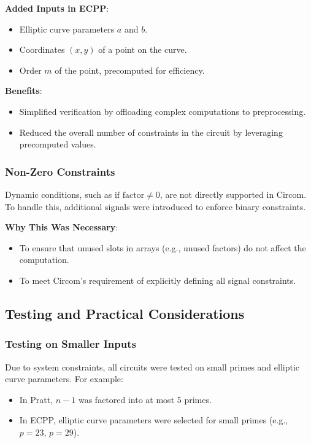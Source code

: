 \documentclass[12pt]{article}
\begin{document}
\textbf{Added Inputs in ECPP}:
\begin{itemize}
    \item Elliptic curve parameters \( a \) and \( b \).
    \item Coordinates \( (x, y) \) of a point on the curve.
    \item Order \( m \) of the point, precomputed for efficiency.
\end{itemize}

\textbf{Benefits}:
\begin{itemize}
    \item Simplified verification by offloading complex computations to preprocessing.
    \item Reduced the overall number of constraints in the circuit by leveraging precomputed values.
\end{itemize}

\subsubsection*{Non-Zero Constraints}
Dynamic conditions, such as \( \text{if factor} \neq 0 \), are not directly supported in Circom. To handle this, additional signals were introduced to enforce binary constraints.

\textbf{Why This Was Necessary}:
\begin{itemize}
    \item To ensure that unused slots in arrays (e.g., unused factors) do not affect the computation.
    \item To meet Circom's requirement of explicitly defining all signal constraints.
\end{itemize}

\subsection*{Testing and Practical Considerations}

\subsubsection*{Testing on Smaller Inputs}
Due to system constraints, all circuits were tested on small primes and elliptic curve parameters. For example:
\begin{itemize}
    \item In Pratt, \( n-1 \) was factored into at most 5 primes.
    \item In ECPP, elliptic curve parameters were selected for small primes (e.g., \( p = 23 \), \( p = 29 \)).
\end{itemize}
\end{document}
